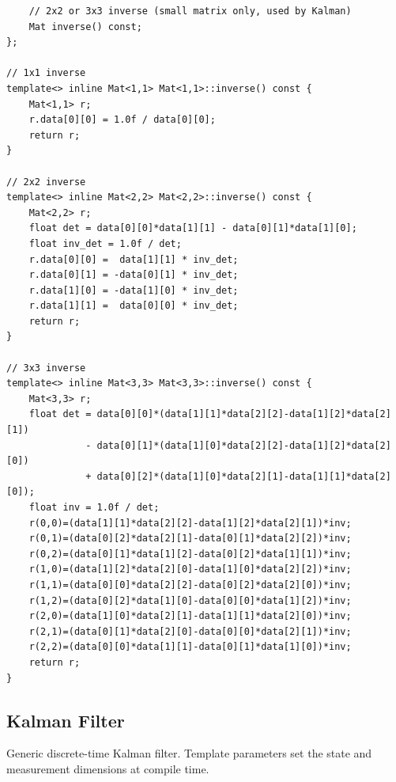 \begin{verbatim}
    // 2x2 or 3x3 inverse (small matrix only, used by Kalman)
    Mat inverse() const;
};

// 1x1 inverse
template<> inline Mat<1,1> Mat<1,1>::inverse() const {
    Mat<1,1> r;
    r.data[0][0] = 1.0f / data[0][0];
    return r;
}

// 2x2 inverse
template<> inline Mat<2,2> Mat<2,2>::inverse() const {
    Mat<2,2> r;
    float det = data[0][0]*data[1][1] - data[0][1]*data[1][0];
    float inv_det = 1.0f / det;
    r.data[0][0] =  data[1][1] * inv_det;
    r.data[0][1] = -data[0][1] * inv_det;
    r.data[1][0] = -data[1][0] * inv_det;
    r.data[1][1] =  data[0][0] * inv_det;
    return r;
}

// 3x3 inverse
template<> inline Mat<3,3> Mat<3,3>::inverse() const {
    Mat<3,3> r;
    float det = data[0][0]*(data[1][1]*data[2][2]-data[1][2]*data[2][1])
              - data[0][1]*(data[1][0]*data[2][2]-data[1][2]*data[2][0])
              + data[0][2]*(data[1][0]*data[2][1]-data[1][1]*data[2][0]);
    float inv = 1.0f / det;
    r(0,0)=(data[1][1]*data[2][2]-data[1][2]*data[2][1])*inv;
    r(0,1)=(data[0][2]*data[2][1]-data[0][1]*data[2][2])*inv;
    r(0,2)=(data[0][1]*data[1][2]-data[0][2]*data[1][1])*inv;
    r(1,0)=(data[1][2]*data[2][0]-data[1][0]*data[2][2])*inv;
    r(1,1)=(data[0][0]*data[2][2]-data[0][2]*data[2][0])*inv;
    r(1,2)=(data[0][2]*data[1][0]-data[0][0]*data[1][2])*inv;
    r(2,0)=(data[1][0]*data[2][1]-data[1][1]*data[2][0])*inv;
    r(2,1)=(data[0][1]*data[2][0]-data[0][0]*data[2][1])*inv;
    r(2,2)=(data[0][0]*data[1][1]-data[0][1]*data[1][0])*inv;
    return r;
}
\end{verbatim}

\subsection{Kalman Filter}

Generic discrete-time Kalman filter. Template parameters set the state and measurement dimensions at compile time.

